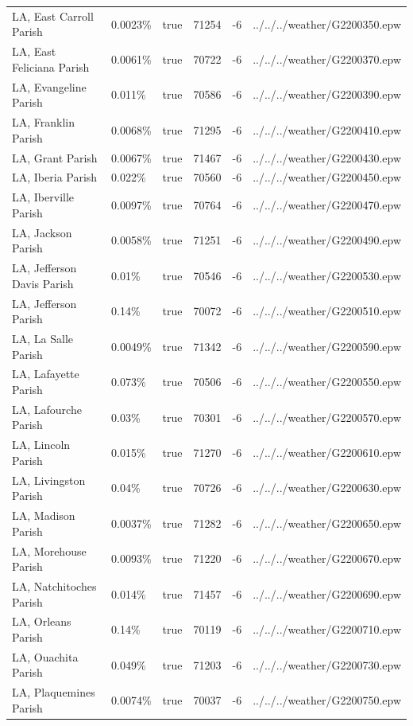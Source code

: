 \begin{longtable}[]{@{}llllll@{}}
LA, East Carroll Parish & 0.0023\% & true & 71254 & -6 &
../../../weather/G2200350.epw \\
LA, East Feliciana Parish & 0.0061\% & true & 70722 & -6 &
../../../weather/G2200370.epw \\
LA, Evangeline Parish & 0.011\% & true & 70586 & -6 &
../../../weather/G2200390.epw \\
LA, Franklin Parish & 0.0068\% & true & 71295 & -6 &
../../../weather/G2200410.epw \\
LA, Grant Parish & 0.0067\% & true & 71467 & -6 &
../../../weather/G2200430.epw \\
LA, Iberia Parish & 0.022\% & true & 70560 & -6 &
../../../weather/G2200450.epw \\
LA, Iberville Parish & 0.0097\% & true & 70764 & -6 &
../../../weather/G2200470.epw \\
LA, Jackson Parish & 0.0058\% & true & 71251 & -6 &
../../../weather/G2200490.epw \\
LA, Jefferson Davis Parish & 0.01\% & true & 70546 & -6 &
../../../weather/G2200530.epw \\
LA, Jefferson Parish & 0.14\% & true & 70072 & -6 &
../../../weather/G2200510.epw \\
LA, La Salle Parish & 0.0049\% & true & 71342 & -6 &
../../../weather/G2200590.epw \\
LA, Lafayette Parish & 0.073\% & true & 70506 & -6 &
../../../weather/G2200550.epw \\
LA, Lafourche Parish & 0.03\% & true & 70301 & -6 &
../../../weather/G2200570.epw \\
LA, Lincoln Parish & 0.015\% & true & 71270 & -6 &
../../../weather/G2200610.epw \\
LA, Livingston Parish & 0.04\% & true & 70726 & -6 &
../../../weather/G2200630.epw \\
LA, Madison Parish & 0.0037\% & true & 71282 & -6 &
../../../weather/G2200650.epw \\
LA, Morehouse Parish & 0.0093\% & true & 71220 & -6 &
../../../weather/G2200670.epw \\
LA, Natchitoches Parish & 0.014\% & true & 71457 & -6 &
../../../weather/G2200690.epw \\
LA, Orleans Parish & 0.14\% & true & 70119 & -6 &
../../../weather/G2200710.epw \\
LA, Ouachita Parish & 0.049\% & true & 71203 & -6 &
../../../weather/G2200730.epw \\
LA, Plaquemines Parish & 0.0074\% & true & 70037 & -6 &
../../../weather/G2200750.epw \\

\end{longtable}
